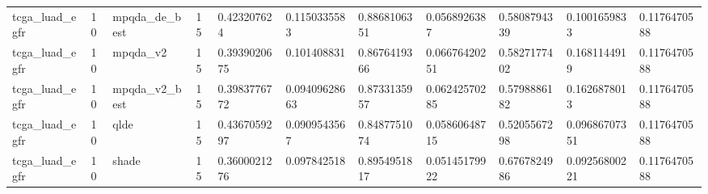 \begin{table}[t]
\begin{tabular}{lllllllllll}
tcga\_luad\_egfr & 10 & mpqda\_de\_best & 15 & 0.423207624 & 0.1150335583 & 0.8868106351 & 0.0568926387 & 0.5808794339 & 0.1001659833 & 0.1176470588 \\
tcga\_luad\_egfr & 10 & mpqda\_v2 & 15 & 0.3939020675 & 0.101408831 & 0.8676419366 & 0.06676420251 & 0.5827177402 & 0.1681144919 & 0.1176470588 \\
tcga\_luad\_egfr & 10 & mpqda\_v2\_best & 15 & 0.3983776772 & 0.09409628663 & 0.8733135957 & 0.06242570285 & 0.5798886182 & 0.1626878013 & 0.1176470588 \\
tcga\_luad\_egfr & 10 & qlde & 15 & 0.4367059297 & 0.0909543567 & 0.8487751074 & 0.05860648715 & 0.5205567298 & 0.09686707351 & 0.1176470588 \\
tcga\_luad\_egfr & 10 & shade & 15 & 0.3600021276 & 0.097842518 & 0.8954951817 & 0.05145179922 & 0.6767824986 & 0.09256800221 & 0.1176470588 \\
\hline
\end{tabular}
\end{table}
